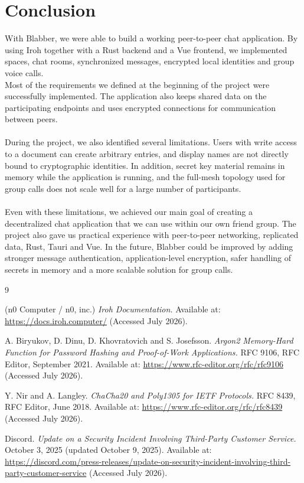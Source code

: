 \documentclass{article} %
\begin{document}
\section{Conclusion}

With Blabber, we were able to build a working peer-to-peer chat application.
By using Iroh together with a Rust backend
and a Vue frontend, we implemented spaces, chat rooms, synchronized messages,
encrypted local identities and group voice calls.
\\
Most of the requirements we defined at the beginning of the project were
successfully implemented.
The application also keeps shared data on the participating endpoints and uses
encrypted connections for communication between peers.
\\
\\
During the project, we also identified several limitations. Users with write
access to a document can create arbitrary entries, and display names are not
directly bound to cryptographic identities. In addition, secret key material
remains in memory while the application is running, and the full-mesh topology
used for group calls does not scale well for a large number of participants.
\\
\\
Even with these limitations, we achieved our main goal of creating a
decentralized chat application that we can use within our own friend group. The
project also gave us practical experience with peer-to-peer networking,
replicated data, Rust, Tauri and Vue. In the future, Blabber could be improved
by adding stronger message authentication, application-level encryption, safer
handling of secrets in memory and a more scalable solution for group calls.

\newpage

\begin{thebibliography}{9}

(n0 Computer / n0, inc.)
\textit{Iroh Documentation.}
Available at: \url{https://docs.iroh.computer/}
(Accessed July 2026).

A. Biryukov, D. Dinu, D. Khovratovich and S. Josefsson.
\textit{Argon2 Memory-Hard Function for Password Hashing and
Proof-of-Work Applications.}
RFC 9106, RFC Editor, September 2021.
Available at: \url{https://www.rfc-editor.org/rfc/rfc9106}
(Accessed July 2026).

Y. Nir and A. Langley.
\textit{ChaCha20 and Poly1305 for IETF Protocols.}
RFC 8439, RFC Editor, June 2018.
Available at: \url{https://www.rfc-editor.org/rfc/rfc8439}
(Accessed July 2026).


Discord.
\textit{Update on a Security Incident Involving Third-Party Customer Service.}
October 3, 2025 (updated October 9, 2025).
Available at:
\url{https://discord.com/press-releases/update-on-security-incident-involving-third-party-customer-service}
(Accessed July 2026).

\end{thebibliography}
\end{document}
